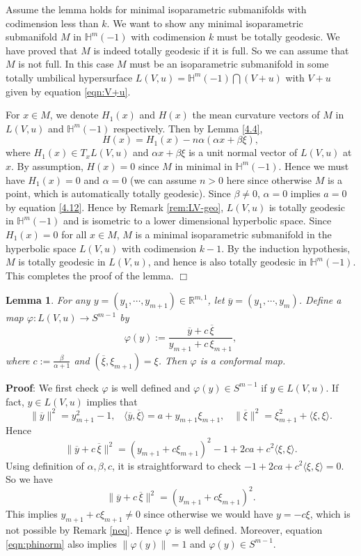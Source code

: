 \documentclass[12pt]{article}
\newtheorem{lem}{Lemma}[section]
\begin{document}
Assume the lemma holds for minimal isoparametric submanifolds with codimension less than $k$.
We want to show any minimal isoparametric submanifold $M$ in $\mathbb{H}^m(-1)$ with codimension $k$
must be totally geodesic.
We have proved that $M$ is indeed totally geodesic if it is full. So we can assume that $M$ is not full.
In this case $M$ must be an isoparametric submanifold in some totally umbilical hypersurface
$L(V, u) = \mathbb{H}^m(-1) \bigcap (V+u)$ with $V+u$ given by equation \eqref{eqn:V+u}.

For $x\in M$, we denote $H_1(x)$ and $ H(x)$ the mean curvature vectors of $M$ in $L(V,u)$ and $\mathbb{H}^m(-1)$
respectively.
Then by Lemma \ref{4.4},
\[ H(x)=H_1(x) - n \alpha (\alpha x + \beta \xi),\]
 where $H_1(x) \in T_x L(V,u)$
and  $\alpha x + \beta \xi$ is a unit normal vector of $L(V,u)$ at $x$. By assumption, $H(x)=0$
since $M$ in minimal in $\mathbb{H}^m(-1)$. Hence we must have
$H_1(x)=0$ and $\alpha =0$ (we can assume $n>0$ here since otherwise $M$ is a point, which is automatically totally
geodesic). Since $\beta \neq 0$, $\alpha =0$ implies $a=0$ by equation \eqref{4.12}. Hence by Remark \ref{rem:LV-geo}, $L(V,u)$ is totally geodesic in $\mathbb{H}^m(-1)$ and is isometric to a lower dimensional hyperbolic space.
Since $H_1(x)=0$ for all $x \in M$, $M$ is a minimal isoparametric submanifold in the hyperbolic space $L(V,u)$ with codimension $k-1$. By the induction hypothesis, $M$ is totally geodesic in $L(V,u)$, and hence is also
totally geodesic in $\mathbb{H}^m(-1)$.
This completes the proof of the lemma.
$\Box$


\begin{lem} \label{lem:varphi}
For any $y=(y_1, \cdots, y_{m+1}) \in \mathbb{R}^{m,1}$, let $\overline{y}=(y_1, \cdots, y_m)$.
Define a map $\varphi: L(V, u) \longrightarrow S^{m-1}$  by
\[ \varphi(y) :=  \frac{\overline{y}+c \, \overline{\xi}}{y_{m+1}+c \, \xi_{m+1}}, \]
where $c := \frac{\beta}{\alpha + 1}$ and $(\overline{\xi}, \xi_{m+1})=\xi$. Then $\varphi$ is a conformal map.
\end{lem}
\noindent


{\bf Proof}:
We first check $\varphi$ is well defined and $\varphi(y) \in S^{m-1}$ if $y \in L(V, u)$. If fact, $y \in L(V, u)$ implies that
\[ \|\overline{y}\|^2=y_{m+1}^2-1, \hspace{10pt}
\langle\overline{y}, \overline{\xi}\rangle = a + y_{m+1} \xi_{m+1}, \hspace{10pt}
\|\overline{\xi}\|^2= \xi_{m+1}^2 + \langle\xi, \xi\rangle. \]
Hence
\[ \|\overline{y}+c \, \overline{\xi} \|^2 = (y_{m+1}+ c \xi_{m+1})^2 -1 + 2 ca  + c^2 \langle\xi, \xi\rangle.\]
Using definition of $\alpha, \beta, c$, it is straightforward to check $-1 + 2 ca  + c^2 \langle\xi, \xi\rangle=0$.
So we have
\begin{equation} \label{eqn:phinorm}
 \|\overline{y}+c \, \overline{\xi} \|^2 = (y_{m+1}+ c \xi_{m+1})^2.
\end{equation}
This implies $y_{m+1}+ c \xi_{m+1}\neq 0$ since otherwise we would have $y= -c \xi$, which is not possible by Remark \ref{neq}. Hence $\varphi$ is well defined. Moreover, equation \eqref{eqn:phinorm} also implies $\| \varphi(y) \| = 1$
and $\varphi(y) \in S^{m-1}$.
\end{document}
